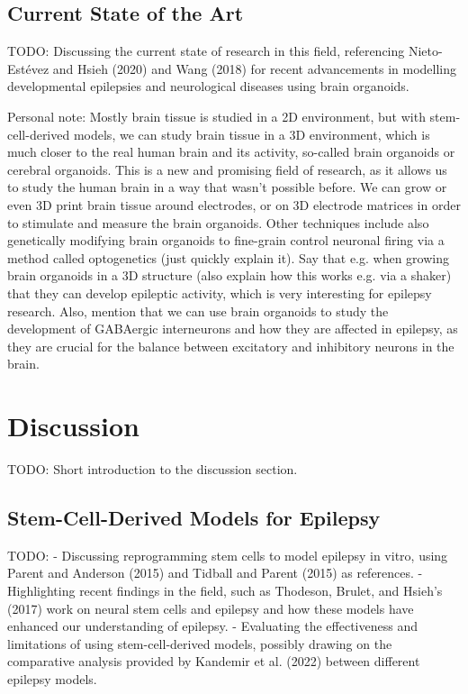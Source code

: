 \documentclass[10pt]{article}
\begin{document}
\begin{sloppypar}
  \subsection{Current State of the Art}
  \label{sec:current-state-of-the-art}

  TODO: Discussing the current state of research in this field, referencing Nieto-Estévez and Hsieh (2020) and Wang (2018) for recent advancements in modelling developmental epilepsies and neurological diseases using brain organoids.

  Personal note: Mostly brain tissue is studied in a 2D environment, but with stem-cell-derived models, we can study brain tissue in a 3D environment, which is much closer to the real human brain and its activity, so-called brain organoids or cerebral organoids. This is a new and promising field of research, as it allows us to study the human brain in a way that wasn't possible before. We can grow or even 3D print brain tissue around electrodes, or on 3D electrode matrices in order to stimulate and measure the brain organoids. Other techniques include also genetically modifying brain organoids to fine-grain control neuronal firing via a method called optogenetics (just quickly explain it). Say that e.g. when growing brain organoids in a 3D structure (also explain how this works e.g. via a shaker) that they can develop epileptic activity, which is very interesting for epilepsy research. Also, mention that we can use brain organoids to study the development of GABAergic interneurons and how they are affected in epilepsy, as they are crucial for the balance between excitatory and inhibitory neurons in the brain.

  \section{Discussion}
  \label{sec:discussion}

  TODO: Short introduction to the discussion section.

  \subsection{Stem-Cell-Derived Models for Epilepsy}
  \label{sec:stem-cell-derived-models-for-epilepsy}

  TODO:
  - Discussing reprogramming stem cells to model epilepsy in vitro, using Parent and Anderson (2015) and Tidball and Parent (2015) as references.
  - Highlighting recent findings in the field, such as Thodeson, Brulet, and Hsieh's (2017) work on neural stem cells and epilepsy and how these models have enhanced our understanding of epilepsy.
  - Evaluating the effectiveness and limitations of using stem-cell-derived models, possibly drawing on the comparative analysis provided by Kandemir et al. (2022) between different epilepsy models.


\end{sloppypar}
\end{document}
